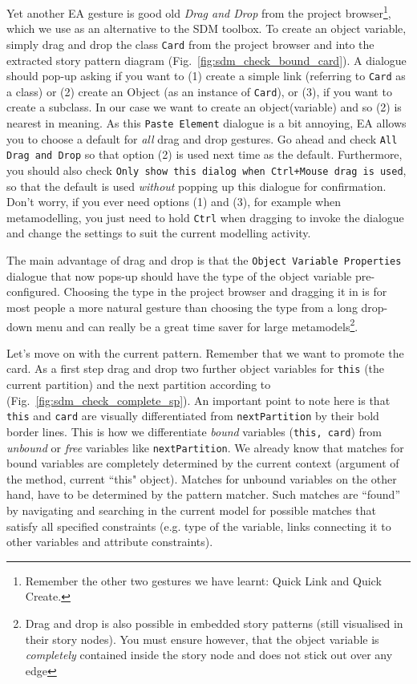 Yet another EA gesture is good old \emph{Drag and Drop} from the project
browser\footnote{Remember the other two gestures we have learnt:  Quick Link
and Quick Create.}, which we use as an alternative to the SDM toolbox.  
To create an object variable, simply drag and drop the class
\texttt{Card} from the project browser and into the extracted story
pattern diagram (Fig.~\ref{fig:sdm_check_bound_card}).  A dialogue should pop-up
asking if you want to (1) create a simple link (referring to \texttt{Card} as a
class) or (2) create an Object (as an instance of \texttt{Card}), or (3), if you
want to create a subclass.  In our case we want to create an object(variable) 
and so (2) is nearest in meaning.  As this \texttt{Paste Element} dialogue is a
bit annoying, EA  allows you to choose a default for \emph{all} drag and drop
gestures.  Go ahead and check \texttt{All Drag and Drop} so that option (2) is
used next time as the default.  Furthermore, you should also check 
\texttt{Only show this dialog when Ctrl+Mouse drag is used}, so that the 
default is used \emph{without} popping up this dialogue for confirmation. Don't worry,
if you ever need options (1) and (3), for example when metamodelling, you  just
need to hold \texttt{Ctrl} when dragging to invoke the dialogue and change  the
settings to suit the current modelling activity. 

The main advantage of drag and drop is that the \texttt{Object Variable
Pro\-per\-ties} dialogue that now pops-up should have the type of the object
variable pre-configured. Choosing the type in the project browser and dragging it in
is for most people a more natural gesture than choosing the type from a long
drop-down menu and can really be a great time saver for large
metamodels\footnote{Drag and drop is also possible in embedded story patterns
(still visualised in their story nodes).  You must ensure however, that the
object variable is \emph{completely} contained inside the story node and does
not stick out over any edge}. 

Let's move on with the current pattern. Remember that we want to promote the
card.  As a first step drag and drop two further object variables for
\texttt{this} (the current partition) and the next partition according to
(Fig.~\ref{fig:sdm_check_complete_sp}).  An important point to note here is
that \texttt{this} and \texttt{card} are visually differentiated from
\texttt{nextPartition} by their bold border lines. This is how we differentiate
\emph{bound}  variables (\texttt{this, card}) from
\emph{unbound} or \emph{free} variables like \texttt{nextPartition}.  We already know that matches for bound variables are completely determined by the current
context (argument of the method, current ``this" object).  Matches for unbound
variables on the other hand, have to be determined by the pattern matcher.  Such
matches are ``found'' by navigating and searching in the current model for
possible matches that satisfy all specified constraints (e.g. type of the
variable, links connecting it to other variables and attribute constraints). 


